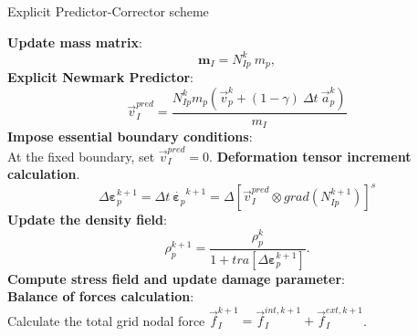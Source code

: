 \message{ !name(2020_EFM_MPM_Eigensoftening.tex)}\documentclass[preprint,12pt,a4paper]{elsarticle}
\newcommand{\tens}[1]{
  \ensuremath{\mathbf{{#1}}}
}
\newcommand\Grad[1]{grad({#1})}
\begin{document}
\begin{algorithm}
  \renewcommand{\thealgorithm}{}
  \caption{Explicit Predictor-Corrector scheme}
  \begin{algorithmic}[1]
    \STATE \textbf{Update mass matrix}:
    \begin{equation*}
      \tens{m}_{I} = N_{Ip}^{k}\ m_p,
    \end{equation*}
    \STATE \textbf{Explicit Newmark Predictor}:\\
    \begin{equation*}
      \vec{v}_I^{pred} = \frac{ N_{Ip}^{k} m_p (\vec{v}_p^k + (1 - \gamma)\ \Delta t\ \vec{a}_p^k)}{m_I}
    \end{equation*}
    \STATE \textbf{Impose essential boundary conditions}:\\
    At the fixed boundary, set $\vec{v}_{I}^{pred} = 0$. 
    \STATE \textbf{Deformation tensor increment calculation}.
    \begin{equation*}
      \Delta \tens{\varepsilon}_{p}^{k+1} = \Delta t\
        \dot{\tens{\varepsilon}_{p}}^{k+1} = \Delta \left[ \vec{v}_{I}^{pred} \otimes
        \Grad{N_{Ip}^{k+1}} \right]^s
    \end{equation*}
    \STATE \textbf{Update the density field}:
    \begin{equation*}
      \rho_p^{k+1} = \frac{\rho_p^k}{1 + \mathit{tra}\left[\Delta\tens{\varepsilon}_{p}^{k+1}\right]}.
    \end{equation*}
    \STATE \textbf{Compute stress field and update damage parameter}:\\
    \STATE \textbf{Balance of forces calculation}:\\
    Calculate the total grid nodal force $\vec{f}_{I}^{k+1} =
    \vec{f}_{I}^{int,k+1} + \vec{f}_{I}^{ext,k+1}$.

\end{algorithmic}
\end{algorithm}
\end{document}
